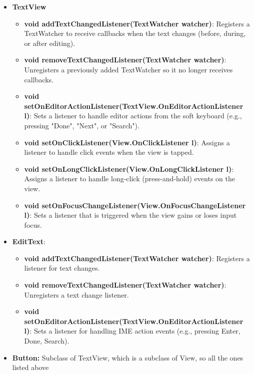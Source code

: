 \documentclass{report}
\begin{document}
\begin{itemize}
\begin{itemize}
            \end{itemize}
        \item \textbf{TextView} 
            \begin{itemize}
                \item \textbf{void addTextChangedListener(TextWatcher watcher)}: Registers a TextWatcher to receive callbacks when the text changes (before, during, or after editing).
                \item \textbf{void removeTextChangedListener(TextWatcher watcher)}: Unregisters a previously added TextWatcher so it no longer receives callbacks.
                \item \textbf{void setOnEditorActionListener(TextView.OnEditorActionListener l)}: Sets a listener to handle editor actions from the soft keyboard (e.g., pressing "Done", "Next", or "Search").
                \item \textbf{void setOnClickListener(View.OnClickListener l)}: Assigns a listener to handle click events when the view is tapped.
                \item \textbf{void setOnLongClickListener(View.OnLongClickListener l)}: Assigns a listener to handle long-click (press-and-hold) events on the view.
                \item \textbf{void setOnFocusChangeListener(View.OnFocusChangeListener l)}: Sets a listener that is triggered when the view gains or loses input focus.
            \end{itemize}
        \item \textbf{EditText}:
            \begin{itemize}
                \item \textbf{void addTextChangedListener(TextWatcher watcher)}: Registers a listener for text changes.
                \item \textbf{void removeTextChangedListener(TextWatcher watcher)}: Unregisters a text change listener.
                \item \textbf{void setOnEditorActionListener(TextView.OnEditorActionListener l)}: Sets a listener for handling IME action events (e.g., pressing Enter, Done, Search).
            \end{itemize}
        \item \textbf{Button:} Subclass of TextView, which is a subclass of View, so all the ones listed above
    \end{itemize}

    \pagebreak 
\end{document}
